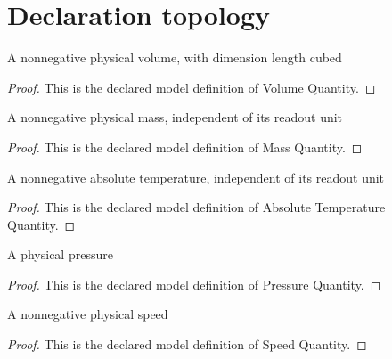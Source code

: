 \section{Declaration topology}
\begin{definition}
  \label{def:physics:phyx-mini-0461:phyxminiproblems-problemphyxmini0461-volumequantity}
  A nonnegative physical volume, with dimension length cubed
\end{definition}
\begin{proof}
  This is the declared model definition of Volume Quantity.
\end{proof}
\begin{definition}
  \label{def:physics:phyx-mini-0461:phyxminiproblems-problemphyxmini0461-massquantity}
  A nonnegative physical mass, independent of its readout unit
\end{definition}
\begin{proof}
  This is the declared model definition of Mass Quantity.
\end{proof}
\begin{definition}
  \label{def:physics:phyx-mini-0461:phyxminiproblems-problemphyxmini0461-absolutetemperaturequantity}
  A nonnegative absolute temperature, independent of its readout unit
\end{definition}
\begin{proof}
  This is the declared model definition of Absolute Temperature Quantity.
\end{proof}
\begin{definition}
  \label{def:physics:phyx-mini-0461:phyxminiproblems-problemphyxmini0461-pressurequantity}
  A physical pressure
\end{definition}
\begin{proof}
  This is the declared model definition of Pressure Quantity.
\end{proof}
\begin{definition}
  \label{def:physics:phyx-mini-0461:phyxminiproblems-problemphyxmini0461-speedquantity}
  A nonnegative physical speed
\end{definition}
\begin{proof}
  This is the declared model definition of Speed Quantity.
\end{proof}
